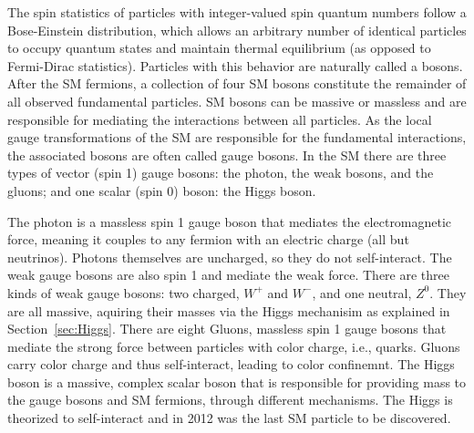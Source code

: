 The spin statistics of particles with integer-valued spin quantum numbers follow a Bose-Einstein distribution, which allows an arbitrary number of identical particles to occupy quantum states and maintain thermal equilibrium (as opposed to Fermi-Dirac statistics). Particles with this behavior are naturally called a bosons. After the SM fermions, a collection of four SM bosons constitute the remainder of all observed fundamental particles. SM bosons can be massive or massless and are responsible for mediating the interactions between all particles. As the local gauge transformations of the SM are responsible for the fundamental interactions, the associated bosons are often called gauge bosons. In the SM there are three types of vector (spin 1) gauge bosons: the photon, the weak bosons, and the gluons; and one scalar (spin 0) boson: the Higgs boson. 

The photon is a massless spin 1 gauge boson that mediates the electromagnetic force, meaning it couples to any fermion with an electric charge (all but neutrinos). Photons themselves are uncharged, so they do not self-interact. The weak gauge bosons are also spin 1 and mediate the weak force. There are three kinds of weak gauge bosons: two charged, $W^+$ and $W^-$, and one neutral, $Z^0$. They are all massive, aquiring their masses via the Higgs mechanisim as explained in Section~\ref{sec:Higgs}. There are eight Gluons, massless spin 1 gauge bosons that mediate the strong force between particles with color charge, i.e., quarks. Gluons carry color charge and thus self-interact, leading to color confinemnt. The Higgs boson is a massive, complex scalar boson that is responsible for providing mass to the gauge bosons and SM fermions, through different mechanisms. The Higgs is theorized to self-interact and in 2012 was the last SM particle to be discovered. 
